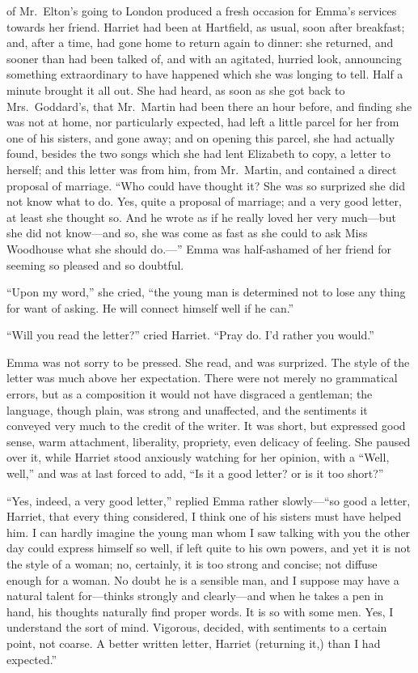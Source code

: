  of Mr.\ Elton's going to London produced a fresh occasion
for Emma's services towards her friend.  Harriet had been at Hartfield,
as usual, soon after breakfast; and, after a time, had gone home
to return again to dinner: she returned, and sooner than had been
talked of, and with an agitated, hurried look, announcing something
extraordinary to have happened which she was longing to tell.
Half a minute brought it all out.  She had heard, as soon as she got
back to Mrs.\ Goddard's, that Mr.\ Martin had been there an hour before,
and finding she was not at home, nor particularly expected, had left
a little parcel for her from one of his sisters, and gone away;
and on opening this parcel, she had actually found, besides the two
songs which she had lent Elizabeth to copy, a letter to herself;
and this letter was from him, from Mr.\ Martin, and contained a direct
proposal of marriage.  ``Who could have thought it? She was so surprized
she did not know what to do.  Yes, quite a proposal of marriage;
and a very good letter, at least she thought so.  And he wrote
as if he really loved her very much---but she did not know---and so,
she was come as fast as she could to ask Miss Woodhouse what she
should do.---'' Emma was half-ashamed of her friend for seeming so
pleased and so doubtful.

``Upon my word,'' she cried, ``the young man is determined not to lose
any thing for want of asking.  He will connect himself well if he can.''

``Will you read the letter?'' cried Harriet.  ``Pray do.  I'd rather
you would.''

Emma was not sorry to be pressed.  She read, and was surprized.
The style of the letter was much above her expectation.
There were not merely no grammatical errors, but as a composition it
would not have disgraced a gentleman; the language, though plain,
was strong and unaffected, and the sentiments it conveyed very much
to the credit of the writer.  It was short, but expressed good sense,
warm attachment, liberality, propriety, even delicacy of feeling.
She paused over it, while Harriet stood anxiously watching for
her opinion, with a ``Well, well,'' and was at last forced to add,
``Is it a good letter? or is it too short?''

``Yes, indeed, a very good letter,'' replied Emma rather slowly---``so
good a letter, Harriet, that every thing considered, I think one of
his sisters must have helped him.  I can hardly imagine the young
man whom I saw talking with you the other day could express himself
so well, if left quite to his own powers, and yet it is not the
style of a woman; no, certainly, it is too strong and concise;
not diffuse enough for a woman.  No doubt he is a sensible man,
and I suppose may have a natural talent for---thinks strongly and
clearly---and when he takes a pen in hand, his thoughts naturally find
proper words.  It is so with some men.  Yes, I understand the sort
of mind.  Vigorous, decided, with sentiments to a certain point,
not coarse.  A better written letter, Harriet (returning it,)
than I had expected.''

